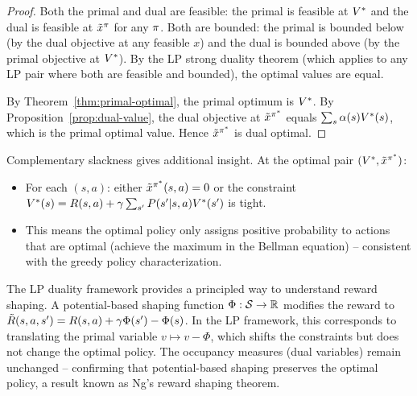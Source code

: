 \documentclass[11pt,a4paper]{article}
\begin{document}
\begin{proof}
Both the primal and dual are feasible: the primal is feasible at
$V^*$ and the dual is feasible at $\tilde{x}^\pi$ for any
$\pi$. Both are bounded: the primal is bounded below (by the
dual objective at any feasible $x$) and the dual is bounded above
(by the primal objective at $V^*$). By the LP strong duality
theorem (which applies to any LP pair where both are feasible and
bounded), the optimal values are equal.

By Theorem~\ref{thm:primal-optimal}, the primal optimum is
$V^*$. By Proposition~\ref{prop:dual-value}, the dual objective
at $\tilde{x}^{\pi^*}$ equals $\sum_s \alpha(s) V^*(s)$,
which is the primal optimal value. Hence
$\tilde{x}^{\pi^*}$ is dual optimal.
\end{proof}

\begin{remark}
\label{rem:complementary-slackness}
Complementary slackness gives additional insight. At the optimal
pair $(V^*, \tilde{x}^{\pi^*})$:
\begin{itemize}[nosep]
    \item For each $(s,a)$: either $\tilde{x}^{\pi^*}(s,a) = 0$
    or the constraint $V^*(s) = R(s,a) + \gamma \sum_{s'}
    P(s'|s,a) V^*(s')$ is tight.
    \item This means the optimal policy only assigns positive
    probability to actions that are optimal (achieve the maximum in
    the Bellman equation) -- consistent with the greedy policy
    characterization.
\end{itemize}
\end{remark}

\begin{rlconnection}[title={LP Duality and Reward Shaping}]
The LP duality framework provides a principled way to understand
reward shaping. A potential-based shaping function
$\Phi : \mathcal{S} \to \mathbb{R}$ modifies the reward to
$\tilde{R}(s,a,s') = R(s,a) + \gamma \Phi(s') - \Phi(s)$. In
the LP framework, this corresponds to translating the primal
variable $v \mapsto v - \Phi$, which shifts the constraints but
does not change the optimal policy. The occupancy measures (dual
variables) remain unchanged -- confirming that potential-based
shaping preserves the optimal policy, a result known as Ng's
reward shaping theorem.
\end{rlconnection}

\end{document}

